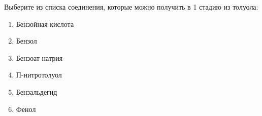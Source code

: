 
Выберите из списка
соединения, которые можно получить в 1 стадию из толуола:

\begin{enumerate}
    \item Бензойная кислота
    \item Бензол
    \item Бензоат натрия
    \item П-нитротолуол
    \item Бензальдегид
    \item Фенол
\end{enumerate}

